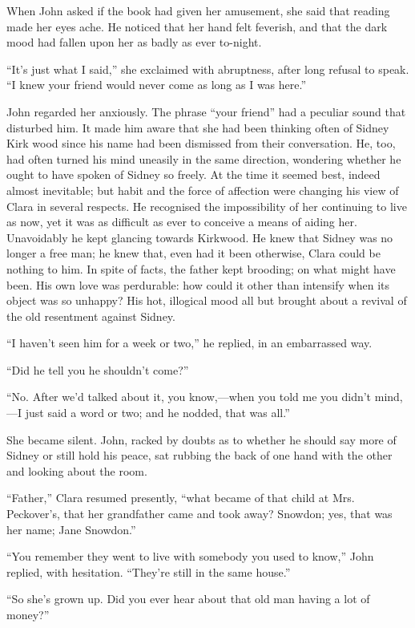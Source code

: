 When John asked if the book had given her amusement, she said that
reading made her eyes ache. He noticed that her hand felt feverish, and
that the dark mood had fallen upon her as badly as ever to-night.

``It's just what I said,'' she exclaimed with abruptness, after long
refusal to speak. ``I knew your friend would never come as long as I was
here.''

John regarded her anxiously. The phrase ``your friend'' had a peculiar
sound that disturbed him. It made him aware that she had {}been thinking
often of Sidney Kirk wood since his name had been dismissed from their
conversation. He, too, had often turned his mind uneasily in the same
direction, wondering whether he ought to have spoken of Sidney so
freely. At the time it seemed best, indeed almost inevitable; but habit
and the force of affection were changing his view of Clara in several
respects. He recognised the impossibility of her continuing to live as
now, yet it was as difficult as ever to conceive a means of aiding her.
Unavoidably he kept glancing towards Kirkwood. He knew that Sidney was
no longer a free man; he knew that, even had it been otherwise, Clara
could be nothing to him. In spite of facts, the father kept brooding; on
what might have been. His own love was perdurable: how could it other
than intensify when its object was so unhappy? His hot, illogical mood
all but brought about a revival of the old resentment against Sidney.

``I haven't seen him for a week or two,'' he replied, in an embarrassed
way.

``Did he tell you he shouldn't come?''

``No. After we'd talked about it, you know,---when you told me you
didn't mind,---I just {}said a word or two; and he nodded, that was
all.''

She became silent. John, racked by doubts as to whether he should say
more of Sidney or still hold his peace, sat rubbing the back of one hand
with the other and looking about the room.

``Father,'' Clara resumed presently, ``what became of that child at Mrs.
Peckover's, that her grandfather came and took away? Snowdon; yes, that
was her name; Jane Snowdon.''

``You remember they went to live with somebody you used to know,'' John
replied, with hesitation. ``They're still in the same house.''

``So she's grown up. Did you ever hear about that old man having a lot
of money?''


